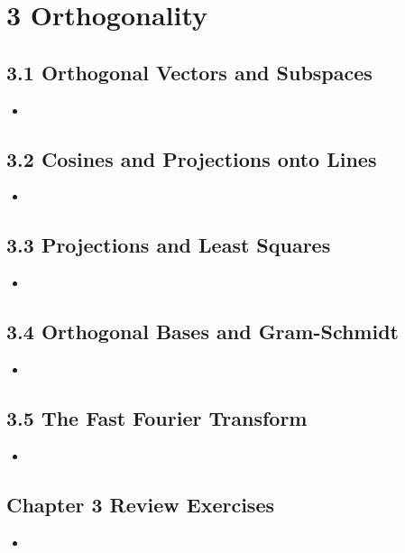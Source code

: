 \chapter{3 Orthogonality}

\section{3.1 Orthogonal Vectors and Subspaces}
\begin{itemize}
  \item []


\end{itemize}

\section{3.2 Cosines and Projections onto Lines}
\begin{itemize}
  \item []


\end{itemize}

\section{3.3 Projections and Least Squares}
\begin{itemize}
  \item []


\end{itemize}

\section{3.4 Orthogonal Bases and Gram-Schmidt}
\begin{itemize}
  \item []


\end{itemize}

\section{3.5 The Fast Fourier Transform}
\begin{itemize}
  \item []


\end{itemize}

\section{Chapter 3 Review Exercises}
\begin{itemize}
  \item []


\end{itemize}



